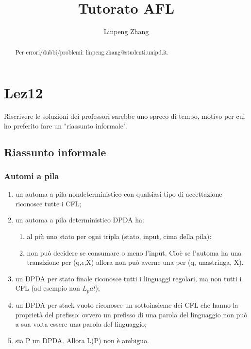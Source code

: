 \documentclass[a4paper,11pt]{article}
\begin{document}
\author{Linpeng Zhang}
\title{Tutorato AFL}
\maketitle
\begin{abstract}
    Per errori/dubbi/problemi: linpeng.zhang@studenti.unipd.it.
\end{abstract}
\tableofcontents
\section{Lez12}
Riscrivere le soluzioni dei professori sarebbe uno spreco di tempo, motivo per cui ho preferito fare un "riassunto informale".
\subsection{Riassunto informale}
\subsubsection{Automi a pila}
\begin{enumerate}
    \item un automa a pila nondeterministico con qualsiasi tipo di accettazione riconosce tutte i CFL;
    \item un automa a pila deterministico DPDA ha:
    \begin{enumerate}
        \item al più uno stato per ogni tripla (stato, input, cima della pila):
        \item non può decidere se consumare o meno l'input. Cioè se l'automa ha una transizione per (q,$\epsilon$,X) allora non può averne una per (q, unastringa, X).
    \end{enumerate}
    \item un DPDA per stato finale riconosce tutti i linguaggi regolari, ma non tutti i CFL (ad esempio non $L_pal$);
    \item un DPDA per stack vuoto riconosce un sottoinsieme dei CFL che hanno la proprietà del prefisso: ovvero un prefisso di una parola del linguaggio non può a sua volta essere una parola del linguaggio;
    \item sia P un DPDA. Allora L(P) non è ambiguo.
\end{enumerate}
\end{document}
